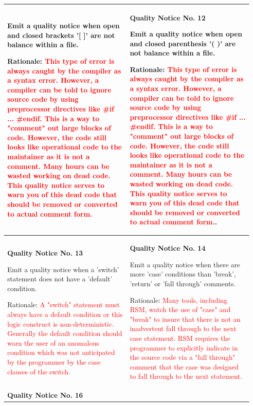 {\begin{longtable}{||p{}|p{}||}
Emit a quality notice when open and closed brackets '[ ]' are not balance within a file.

Rationale:  \textcolor{red}{This type of error is always caught by the compiler as a syntax error.  However, a compiler can be told to ignore source code by using preprocessor directives like \#if ... \#endif.  This is a way to "comment" out large blocks of code.  However, the code still looks like operational code to the maintainer as it is not a comment.  Many hours can be wasted working on dead code.  This quality notice serves to warn you of this dead code that should be removed or converted to actual comment form.}
 & \textbf{Quality Notice No. 12}
 
Emit a quality notice when open and closed parenthesis '( )' are not balance within a file.

Rationale:  \textcolor{red}{This type of error is always caught by the compiler as a syntax error.  However, a compiler can be told to ignore source code by using preprocessor directives like \#if ... \#endif.  This is a way to "comment" out large blocks of code.  However, the code still looks like operational code to the maintainer as it is not a comment.  Many hours can be wasted working on dead code.  This quality notice serves to warn you of this dead code that should be removed or converted to actual comment form.}.
    \\
    \hline \textbf{Quality Notice No. 13}
    
Emit a quality notice when a 'switch' statement does not have a 'default' condition.

Rationale:  \textcolor{red}{A "switch" statement must always have a default condition or this logic construct is non-deterministic.  Generally the default condition should warn the user of an anomalous condition which was not anticipated by the programmer by the case clauses of the switch.}
 & \textbf{Quality Notice No. 14}
 
Emit a quality notice when there are more 'case' conditions than 'break', 'return' or 'fall through' comments.

Rationale:  \textcolor{red}{Many tools, including RSM, watch the use of "case" and "break" to insure that there is not an inadvertent fall through to the next case statement.  RSM requires the programmer to explicitly indicate in the source code via a "fall through" comment that the case was designed to fall through to the next statement.}
    \\
    \hline \textbf{Quality Notice No. 16}
    

\end{longtable}}
